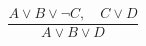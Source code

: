 \documentclass[preview,border=4pt]{standalone}
\begin{document}
\[
\frac{A \lor B \lor \neg C,\quad C \lor D}{A \lor B \lor D}
\]
\end{document}
